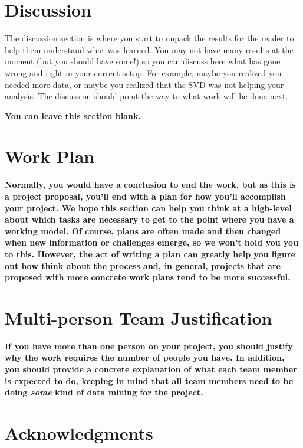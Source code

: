 \documentclass[11pt,a4paper]{article}
\begin{document}
\section{Discussion}

The discussion section is where you start to unpack the results for the reader
to help them understand what was learned.  You may not have many results at the
moment (but you should have some!) so you can discuss here what has gone wrong
and right in your current setup.  For example, maybe you realized you needed
more data, or maybe you realized that the SVD was not helping your analysis.
The discussion should point the way to what work will be done next.


\textbf{ \color{red} You can leave this section blank. }




\section{Work Plan}

\textbf{ \color{red}  Normally, you would have a conclusion to end the work, but as this is a project proposal,
you'll end with a plan for how you'll accomplish your project.  We hope this section can help you think at a high-level about which tasks are necessary to get to the point where you have a working model.  Of course, plans are often made and then changed when new information or challenges emerge, so we won't hold you you to this.  However, the act of writing a plan can greatly help you figure out how think about the process and, in general, projects that are proposed with more concrete work plans tend to be more successful.
}

\section{Multi-person Team Justification}

\textbf{ \color{red} If you have more than one person on your project, you should justify why the work requires the number of people you have.  In addition, you should provide a concrete explanation of what each team member is expected to do, keeping in mind that all team members need to be doing \textit{some} kind of data mining for the project.}

\section*{Acknowledgments}
\end{document}
